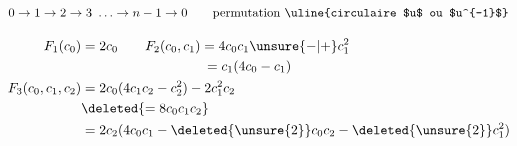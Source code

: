 \[
0\to1\to2\to3\ \ldots\to n-1\to0\qquad\text{permutation \uline{circulaire $u$ ou $u^{-1}$}}
\]

\[
\begin{aligned}
F_1(c_0)&=2c_0\qquad F_2(c_0,c_1)=4c_0c_1\unsure{-|+}c_1^2\\
&\hspace{9em}=c_1(4c_0-c_1)\\
F_3(c_0,c_1,c_2)&=2c_0(4c_1c_2-c_2^2)-2c_1^2c_2\\
&\deleted{=8c_0c_1c_2}\\
&=2c_2(4c_0c_1-\deleted{\unsure{2}}c_0c_2-\deleted{\unsure{2}}c_1^2)
\end{aligned}
\]
